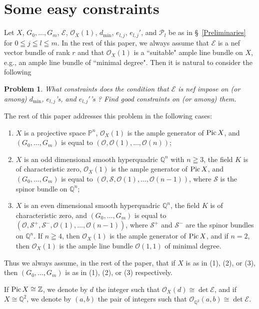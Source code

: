 \documentclass[a4paper,12pt]{amsart}
\newtheorem{Problem}{Problem}[section]
\newcommand{\Pic}{\mathop{\rm Pic}\nolimits}
\begin{document}
\section{Some easy constraints}\label{easyconstraints}
Let $X$, $G_0,\dots,G_m$,
$\mathcal{E}$, $\mathcal{O}_X(1)$,
$d_{\min}$, $e_{l,j}$, $e_{l,j}'$, and 
$\mathcal{P}_l
$
be as in 
\S~\ref{Preliminaries}
for $0\leqq j\leqq l\leqq m$.
In the rest of this paper, we always assume that $\mathcal{E}$ is a nef vector bundle
of rank $r$
and that $\mathcal{O}_X(1)$ is a ``suitable" ample line bundle on $X$,
e.g., an ample line bundle of ``minimal degree".
Then it is natural to consider the following
\begin{Problem} 
What constraints does the condition that $\mathcal{E}$ is nef
impose on (or among) $d_{\min}$, $e_{l,j}$'s, and $e_{l,j}'$'s ?
Find good constraints on (or among) them.
\end{Problem}
The rest of this paper addresses this problem in the following cases:
\begin{enumerate}
\item $X$ is a projective space $\mathbb{P}^n$, 
$\mathcal{O}_X(1)$ is the ample generator of $\Pic X$,
and $(G_0,\dots, G_m)$ is equal to $(\mathcal{O},\mathcal{O}(1),\dots,\mathcal{O}(n))$;
\item $X$ is an odd dimensional smooth hyperquadric 
$\mathbb{Q}^n$ with $n\geqq 3$,
the field $K$ is of characteristic zero,
$\mathcal{O}_X(1)$ is the ample generator of $\Pic X$,
and $(G_0,\dots, G_m)$ is equal to $(\mathcal{O},\mathcal{S},\mathcal{O}(1),\dots,
\mathcal{O}(n-1)
)$,
where 
$\mathcal{S}$ is the spinor bundle on 
$\mathbb{Q}^{
n}$;
\item $X$ is an even dimensional smooth hyperquadric 
$\mathbb{Q}^{
n}$, 
the field $K$ is of characteristic zero,
and $(G_0,\dots, G_m)$ is equal to 
$(\mathcal{O},\mathcal{S}^+,\mathcal{S}^-, \mathcal{O}(1),\dots,
\mathcal{O}(
n-1))$,
where 
$\mathcal{S}^+$ and $\mathcal{S}^-$ are the spinor bundles on 
$\mathbb{Q}^{
n}$.
If 
$n\geqq 4$,
then $\mathcal{O}_X(1)$ is the ample generator of $\Pic X$,
and if 
$n=2$,
then $\mathcal{O}_X(1)$ is the ample line bundle $\mathcal{O}(1,1)$ of minimal degree.
\end{enumerate}
Thus we always assume, in the rest of the paper,  that if 
$X$ is as in (1), (2), or (3), then $(G_0,\dots,G_m)$ is as in (1), (2), or (3) respectively.


If $\Pic X\cong \mathbb{Z}$, 
we denote by $d$ the 
integer 
such that $\mathcal{O}_X(d)\cong \det\mathcal{E}$,
and if 
$X\cong \mathbb{Q}^2$,
we denote by $(a,b)$ the pair of 
integers 
such that $\mathcal{O}_{\mathbb{Q}^2}(a,b)\cong \det\mathcal{E}$.
\end{document}

